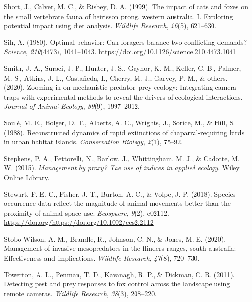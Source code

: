 \documentclass[]{elsarticle} %
\begin{document}
\leavevmode\hypertarget{ref-short1999}{}%
Short, J., Calver, M. C., \& Risbey, D. A. (1999). The impact of cats and foxes on the small vertebrate fauna of heirisson prong, western australia. I. Exploring potential impact using diet analysis. \emph{Wildlife Research}, \emph{26}(5), 621--630.

\leavevmode\hypertarget{ref-SIH1041}{}%
Sih, A. (1980). Optimal behavior: Can foragers balance two conflicting demands? \emph{Science}, \emph{210}(4473), 1041--1043. \url{https://doi.org/10.1126/science.210.4473.1041}

\leavevmode\hypertarget{ref-smith2020}{}%
Smith, J. A., Suraci, J. P., Hunter, J. S., Gaynor, K. M., Keller, C. B., Palmer, M. S., Atkins, J. L., Castañeda, I., Cherry, M. J., Garvey, P. M., \& others. (2020). Zooming in on mechanistic predator--prey ecology: Integrating camera traps with experimental methods to reveal the drivers of ecological interactions. \emph{Journal of Animal Ecology}, \emph{89}(9), 1997--2012.

\leavevmode\hypertarget{ref-soule1988}{}%
Soulé, M. E., Bolger, D. T., Alberts, A. C., Wrights, J., Sorice, M., \& Hill, S. (1988). Reconstructed dynamics of rapid extinctions of chaparral-requiring birds in urban habitat islands. \emph{Conservation Biology}, \emph{2}(1), 75--92.

\leavevmode\hypertarget{ref-stephens2015}{}%
Stephens, P. A., Pettorelli, N., Barlow, J., Whittingham, M. J., \& Cadotte, M. W. (2015). \emph{Management by proxy? The use of indices in applied ecology}. Wiley Online Library.

\leavevmode\hypertarget{ref-stewart2018}{}%
Stewart, F. E. C., Fisher, J. T., Burton, A. C., \& Volpe, J. P. (2018). Species occurrence data reflect the magnitude of animal movements better than the proximity of animal space use. \emph{Ecosphere}, \emph{9}(2), e02112. \url{https://doi.org/https://doi.org/10.1002/ecs2.2112}

\leavevmode\hypertarget{ref-stobo2020management}{}%
Stobo-Wilson, A. M., Brandle, R., Johnson, C. N., \& Jones, M. E. (2020). Management of invasive mesopredators in the flinders ranges, south australia: Effectiveness and implications. \emph{Wildlife Research}, \emph{47}(8), 720--730.

\leavevmode\hypertarget{ref-towerton2011}{}%
Towerton, A. L., Penman, T. D., Kavanagh, R. P., \& Dickman, C. R. (2011). Detecting pest and prey responses to fox control across the landscape using remote cameras. \emph{Wildlife Research}, \emph{38}(3), 208--220.
\end{document}
